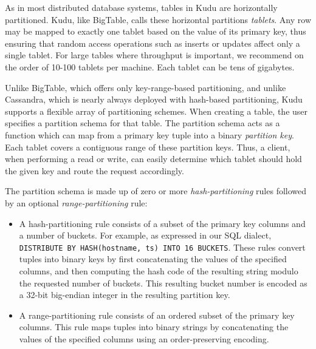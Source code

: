 \documentclass{vldb}
\begin{document}
As in most distributed database systems, tables in Kudu are horizontally partitioned. Kudu, like
BigTable, calls these horizontal partitions {\em tablets}. Any row may be mapped to exactly one
tablet based on the value of its primary key, thus ensuring that random access operations such as
inserts or updates affect only a single tablet. For large tables where throughput is important, we
recommend on the order of 10-100 tablets per machine. Each tablet can be tens of gigabytes.

Unlike BigTable, which offers only key-range-based partitioning, and unlike Cassandra, which is
nearly always deployed with hash-based partitioning, Kudu supports a flexible array of partitioning
schemes. When creating a table, the user specifies a partition schema for that table. The partition schema
acts as a function which can map from a primary key tuple into a binary {\em partition key}. Each
tablet covers a contiguous range of these partition keys. Thus, a client, when performing a read or
write, can easily determine which tablet should hold the given key and route the request
accordingly.

The partition schema is made up of zero or more {\em hash-partitioning} rules followed by an
optional {\em range-partitioning} rule:
\begin{itemize}
\item A hash-partitioning rule consists of a subset of the primary key columns and a number of
  buckets. For example, as expressed in our SQL dialect, {\tt DISTRIBUTE BY HASH(hostname, ts) INTO
  16 BUCKETS}. These rules convert tuples into binary keys by first concatenating the values
  of the specified columns, and then computing the hash code of the resulting string
  modulo the requested number of buckets. This resulting bucket number is encoded as a 32-bit
  big-endian integer in the resulting partition key.

\item A range-partitioning rule consists of an ordered subset of the primary key columns. This
  rule maps tuples into binary strings by concatenating the values of the specified columns
  using an order-preserving encoding.
\end{itemize}

\end{document}
